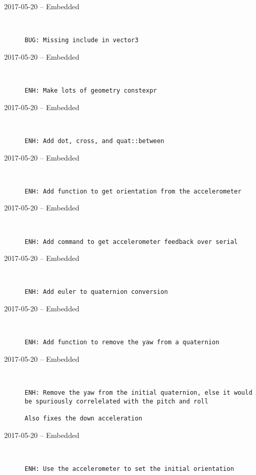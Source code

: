 \begin{description}
  \item[2017-05-20 -- Embedded] \hfill \
\begin{lstlisting}
BUG: Missing include in vector3
\end{lstlisting}


  \item[2017-05-20 -- Embedded] \hfill \
\begin{lstlisting}
ENH: Make lots of geometry constexpr
\end{lstlisting}


  \item[2017-05-20 -- Embedded] \hfill \
\begin{lstlisting}
ENH: Add dot, cross, and quat::between
\end{lstlisting}


  \item[2017-05-20 -- Embedded] \hfill \
\begin{lstlisting}
ENH: Add function to get orientation from the accelerometer
\end{lstlisting}


  \item[2017-05-20 -- Embedded] \hfill \
\begin{lstlisting}
ENH: Add command to get accelerometer feedback over serial
\end{lstlisting}


  \item[2017-05-20 -- Embedded] \hfill \
\begin{lstlisting}
ENH: Add euler to quaternion conversion
\end{lstlisting}


  \item[2017-05-20 -- Embedded] \hfill \
\begin{lstlisting}
ENH: Add function to remove the yaw from a quaternion
\end{lstlisting}


  \item[2017-05-20 -- Embedded] \hfill \
\begin{lstlisting}
ENH: Remove the yaw from the initial quaternion, else it would be spuriously correlelated with the pitch and roll

Also fixes the down acceleration
\end{lstlisting}


  \item[2017-05-20 -- Embedded] \hfill \
\begin{lstlisting}
ENH: Use the accelerometer to set the initial orientation
\end{lstlisting}



\end{description}
